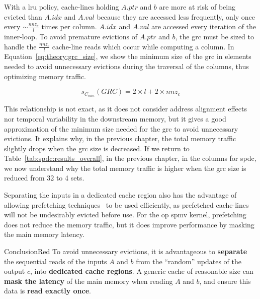 With a \acrshort{lru} policy, cache-lines holding $\mathit{A.ptr}$ and $b$ are more at risk of being evicted than $\mathit{A.idx}$ and $\mathit{A.val}$ because they are accessed less frequently, only once every $\sim \frac{\mathit{nnz}_c}{l}$ times per column.
$\mathit{A.idx}$ and $\mathit{A.val}$ are accessed every iteration of the inner-loop.
To avoid premature \glspl{eviction} of $\mathit{A.ptr}$ and $b$, the \acrshort{grc} must be sized to handle the $\frac{\mathit{nnz}_c}{l}$ cache-line reads which occur while computing a column.
In Equation~\ref{eq:theory:grc_size}, we show the minimum size of the \acrshort{grc} in elements needed to avoid unnecessary \glspl{eviction} during the traversal of the columns, thus optimizing memory traffic.

\begin{equation}
    s_{C_\mathit{min}}(\mathit{GRC}) = 2 \times l + 2 \times \mathit{nnz}_c
    \label{eq:theory:grc_size}
\end{equation}

This relationship is not exact, as it does not consider address alignment effects nor temporal variability in the downstream memory, but it gives a good approximation of the minimum size needed for the \acrshort{grc} to avoid unnecessary \glspl{eviction}.
It explains why, in the previous chapter, the total memory traffic slightly drops when the \acrshort{grc} size is decreased.
If we return to Table~\ref{tab:spdc:results_overall}, in the previous chapter, in the columns for \acrshort{spdc}, we now understand why the total memory traffic is higher when the \acrshort{grc} size is reduced from 32 to 4 \glspl{set}.

Separating the inputs in a dedicated cache region also has the advantage of allowing prefetching techniques~\cite{Smith1982_Prefetcher} to be used efficiently, as prefetched cache-lines will not be undesirably evicted before use.
For the \acrshort{op} \acrshort{spmv} kernel, prefetching does not reduce the memory traffic, but it does improve performance by masking the main memory latency.

\begin{highlight}{Conclusion}{Red}
    To avoid unnecessary \glspl{eviction}, it is advantageous to \textbf{separate} the sequential reads of the inputs $A$ and $b$ from the ``random'' updates of the output $c$, into \textbf{dedicated cache regions}.
    A generic cache of reasonable size can \textbf{mask the latency} of the main memory when reading $A$ and $b$, and ensure this data is \textbf{read exactly once}.
\end{highlight}